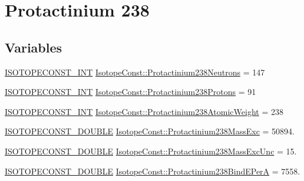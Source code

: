 \hypertarget{group___isotope_const-_protactinium-_pa238}{}\section{Protactinium 238}
\label{group___isotope_const-_protactinium-_pa238}
\subsection*{Variables}
\begin{DoxyCompactItemize}
\item 
\mbox{\hyperlink{group___isotope_const-_macros_ga5f18360b3e99483a35c32d789e62621c}{I\+S\+O\+T\+O\+P\+E\+C\+O\+N\+S\+T\+\_\+\+I\+NT}} \mbox{\hyperlink{group___isotope_const-_protactinium-_pa238_ga23bb567ce2ebf0405fd6265220ef898a}{Isotope\+Const\+::\+Protactinium238\+Neutrons}} = 147
\item 
\mbox{\hyperlink{group___isotope_const-_macros_ga5f18360b3e99483a35c32d789e62621c}{I\+S\+O\+T\+O\+P\+E\+C\+O\+N\+S\+T\+\_\+\+I\+NT}} \mbox{\hyperlink{group___isotope_const-_protactinium-_pa238_ga0c898cacda382099604d3c9b7c72edbb}{Isotope\+Const\+::\+Protactinium238\+Protons}} = 91
\item 
\mbox{\hyperlink{group___isotope_const-_macros_ga5f18360b3e99483a35c32d789e62621c}{I\+S\+O\+T\+O\+P\+E\+C\+O\+N\+S\+T\+\_\+\+I\+NT}} \mbox{\hyperlink{group___isotope_const-_protactinium-_pa238_gaad1f3c8d960bc2402a471b1d278ee3ad}{Isotope\+Const\+::\+Protactinium238\+Atomic\+Weight}} = 238
\item 
\mbox{\hyperlink{group___isotope_const-_macros_ga8f45a7272ce02c0b4c65c44636ed719a}{I\+S\+O\+T\+O\+P\+E\+C\+O\+N\+S\+T\+\_\+\+D\+O\+U\+B\+LE}} \mbox{\hyperlink{group___isotope_const-_protactinium-_pa238_ga8462c3342c67cb1dc3880cec52602989}{Isotope\+Const\+::\+Protactinium238\+Mass\+Exc}} = 50894.
\item 
\mbox{\hyperlink{group___isotope_const-_macros_ga8f45a7272ce02c0b4c65c44636ed719a}{I\+S\+O\+T\+O\+P\+E\+C\+O\+N\+S\+T\+\_\+\+D\+O\+U\+B\+LE}} \mbox{\hyperlink{group___isotope_const-_protactinium-_pa238_ga7b21780b95d98fbccaff07aaeb035375}{Isotope\+Const\+::\+Protactinium238\+Mass\+Exc\+Unc}} = 15.
\item 
\mbox{\hyperlink{group___isotope_const-_macros_ga8f45a7272ce02c0b4c65c44636ed719a}{I\+S\+O\+T\+O\+P\+E\+C\+O\+N\+S\+T\+\_\+\+D\+O\+U\+B\+LE}} \mbox{\hyperlink{group___isotope_const-_protactinium-_pa238_ga560a5d0b05897efd8c5e90ec90557715}{Isotope\+Const\+::\+Protactinium238\+Bind\+E\+PerA}} = 7558.

\end{DoxyCompactItemize}
